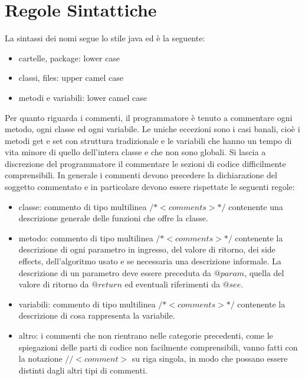 \section{Regole Sintattiche}
La sintassi dei nomi segue lo stile java ed \`e la seguente:
\begin{itemize}
	\item cartelle, package: lower case
	\item classi, files: upper camel case
	\item metodi e variabili: lower camel case
\end{itemize}
Per quanto riguarda i commenti, il programmatore \`e tenuto a commentare ogni metodo, ogni classe ed ogni variabile. Le uniche eccezioni sono i casi banali, cio\`e i metodi get e set con struttura tradizionale e le variabili che hanno un tempo di vita minore di quello dell'intera classe e che non sono globali. Si lascia a discrezione del programmatore il commentare le sezioni di codice difficilmente comprensibili. In generale i commenti devono precedere la dichiarazione del soggetto commentato e in particolare devono essere rispettate le seguenti regole:
\begin{itemize}
	\item classe: commento di tipo multilinea $/* <comments> */$ contenente una descrizione generale delle funzioni che offre la classe.
	\item metodo: commento di tipo multilinea $/* <comments> */$ contenente la descrizione di ogni parametro in ingresso, del valore di ritorno, dei side effects, dell'algoritmo usato e se necessaria una descrizione informale. La descrizione di un parametro deve essere preceduta da $@param$, quella del valore di ritorno da $@return$ ed eventuali riferimenti da $@see$.
	\item variabili: commento di tipo multilinea $/* <comments> */$ contenente la descrizione di cosa rappresenta la variabile.
	\item altro: i commenti che non rientrano nelle categorie precedenti, come le spiegazioni delle parti di codice non facilmente comprensibili, vanno fatti con la notazione $// <comment>$ su riga singola, in modo che possano essere distinti dagli altri tipi di commenti.
\end{itemize}